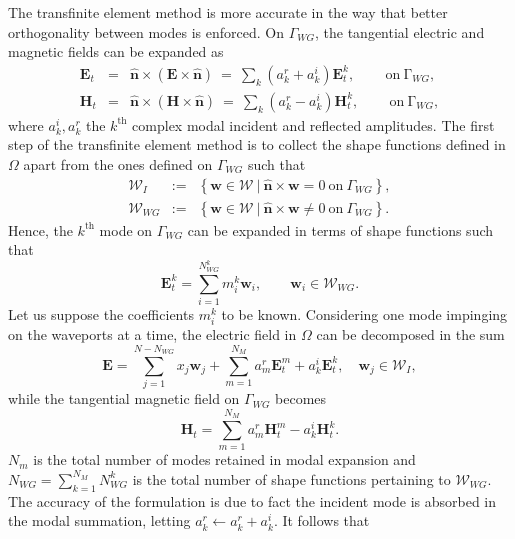 The transfinite element method is more accurate in the way that better orthogonality between modes is enforced. On $\Gamma_{WG}$, the tangential electric and magnetic fields can be expanded as
\begin{eqnarray}
{\mathbf{E}}_t & = & \hat{\mathbf{n}} \times ( {\mathbf{E}} \times \hat{\mathbf{n}}) \ = \ \sum_{k} \left ( a_k^r + a_k^i \right ) \mathbf{E}_t^k, \qquad \, \mathrm{on} \ \mathrm{\Gamma}_{WG}, \\
{\mathbf{H}}_t & = & \hat{\mathbf{n}} \times ( {\mathbf{H}} \times \hat{\mathbf{n}}) \ = \ \sum_{k} \left ( a_k^r - a_k^i \right ) \mathbf{H}_t^k, \qquad \, \mathrm{on} \ \mathrm{\Gamma}_{WG},
\end{eqnarray} where $a_k^i, a_k^r$ the $k^\mathrm{th}$ complex modal incident and reflected amplitudes. The first step of the transfinite element method is to collect the shape functions defined in $\Omega$ apart from the ones defined on $\Gamma_{WG}$ such that
\begin{eqnarray}
\mathcal{W}_I & := & \left\lbrace \mathbf{w} \in \mathcal{W} \ | \ \hat{\mathbf{n}} \times \mathbf{w} = 0 \ \mathrm{on} \ \Gamma_{WG} \right\rbrace,\\
\mathcal{W}_{WG} & := & \left\lbrace \mathbf{w} \in \mathcal{W} \ | \ \hat{\mathbf{n}} \times \mathbf{w} \neq 0 \ \mathrm{on} \ \Gamma_{WG} \right\rbrace.
\end{eqnarray}
\noindent Hence, the $k^\mathrm{th}$ mode on $\Gamma_{WG}$ can be expanded in terms of shape functions such that
\begin{equation}
\label{eq:modalExp}
\mathbf{E}_t^k = \sum_{i=1}^{N_{WG}^k} m_i^k \mathbf{w}_i, \qquad \mathbf{w}_i \in \mathcal{W}_{WG}.
\end{equation}
\noindent Let us suppose the coefficients $m_i^k$ to be known. Considering one mode impinging on the waveports at a time, the electric field in $\Omega$ can be decomposed in the sum
\begin{equation}
\mathbf{E} = \sum_{j=1}^{N-N_{WG}} x_j \mathbf{w}_j + \sum_{m=1}^{N_M} a_m^r \mathbf{E}_t^m
+ a_k^i \mathbf{E}_t^k, \quad \mathbf{w}_j \in \mathcal{W}_I,
\end{equation}
\noindent while the tangential magnetic field on $\Gamma_{WG}$ becomes 
\begin{equation}
\mathbf{H}_t = \sum_{m=1}^{N_M} a_m^r \mathbf{H}_t^m - a_k^i \mathbf{H}_t^k.
\end{equation}
\noindent $N_m$ is the total number of modes retained in modal expansion and $N_{WG} = \sum_{k=1}^{N_M} N_{WG}^k$ is the total number of shape functions pertaining to $\mathcal{W}_{WG}$. The accuracy of the formulation is due to fact the incident mode is absorbed in the modal summation, letting $a_k^r \leftarrow a_k^r + a_k^i$. It follows that

